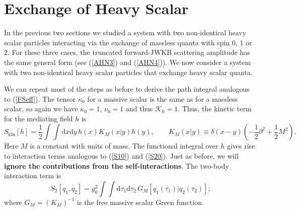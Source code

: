 \section{Exchange of Heavy Scalar\label{sec6}}
In the previous two sections we studied a system with two non-identical heavy scalar particles interacting via the exchange of massless quanta with spin $0$, $1$ or $2$. For these three cases, the truncated forward-JWKB scattering amplitude has the same general form (see (\ref{AHN3}) and (\ref{AHN4})). We now consider a system with two non-identical heavy scalar particles that exchange heavy scalar quanta.

We can repeat most of the steps as before to derive the path integral analogous to (\ref{FSeff}). The tensor $\kappa_{0}$ for a massive scalar is the same as for a massless scalar, so again we have $\kappa_{0} = 1$, $\nu_{0} = 1$ and thus $\mathcal{K}_{0} = 1$. Thus, the kinetic term for the mediating field $h$ is
\begin{equation}
	S_{\text{kin}}[h] = \frac{1}{2} \int \int \mathrm{d}x \mathrm{d}y \, h(x) K_{M}(x|y) h(y), \qquad K_{M}(x|y) \equiv \delta(x - y) \left(- \frac{1}{2} \partial^{2} + \frac{1}{2} M^{2} \right).
\end{equation}
Here $M$ is a constant with units of mass. The functional integral over $h$ gives rise to interaction terms analogous to (\ref{S10}) and (\ref{S20}). Just as before, we will \textbf{ignore the contributions from the self-interactions}. The two-body interaction term is
\begin{equation}
	S_{2}[q_{1}, q_{2}] = g_{0}^{2} \int \int \mathrm{d}\tau_{1} \mathrm{d}\tau_{2} \, G_{M}[q_{1}(\tau_{1}) | q_{2}(\tau_{2})];
\end{equation}
where $G_{M} = (K_{M})^{-1}$ is the free massive scalar Green function.

